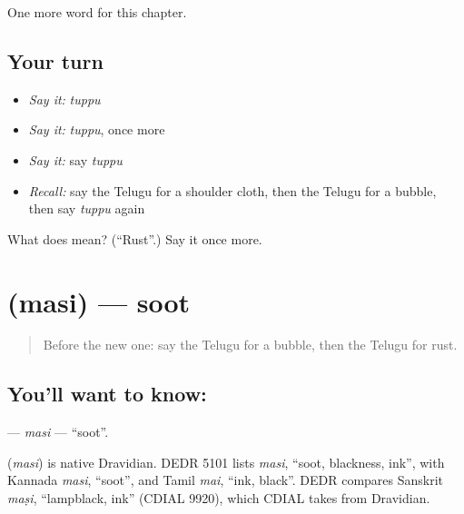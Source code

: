 \begin{grammarlens}[title={What you've built}]
One more word for this chapter.
\end{grammarlens}

\subsection*{Your turn}
\begin{itemize}
\raggedright
  \item \emph{Say it:} \emph{tuppu}
  \item \emph{Say it:} \emph{tuppu}, once more
  \item \emph{Say it:} say \emph{tuppu}
  \item \emph{Recall:} say the Telugu for a shoulder cloth, then the Telugu for a bubble, then say \emph{tuppu} again
\end{itemize}

\begin{tcolorbox}[breakable,colback=teal!4,colframe=teal!35!black,title={Before you move on}]
What does  mean? (\textquotedblleft{}Rust\textquotedblright{}.) Say it once more.
\end{tcolorbox}
\section[\texorpdfstring{\te{మసి} (masi)}{మసి (masi)}]{ (masi) — soot}

\label{lesson:TE-C233-masi}



\begin{quote}
Before the new one: say the Telugu for a bubble, then the Telugu for rust.
\end{quote}

\subsection*{You'll want to know: }
\textbf{} — \emph{masi} — \textquotedblleft{}soot\textquotedblright{}.

\begin{cousinweb}
\textbf{} (\emph{masi}) is native Dravidian. DEDR 5101 lists \emph{masi}, \textquotedblleft{}soot, blackness, ink\textquotedblright{}, with Kannada \emph{masi}, \textquotedblleft{}soot\textquotedblright{}, and Tamil \emph{mai}, \textquotedblleft{}ink, black\textquotedblright{}. DEDR compares Sanskrit \emph{maṣi}, \textquotedblleft{}lampblack, ink\textquotedblright{} (CDIAL 9920), which CDIAL takes from Dravidian.
\end{cousinweb}

